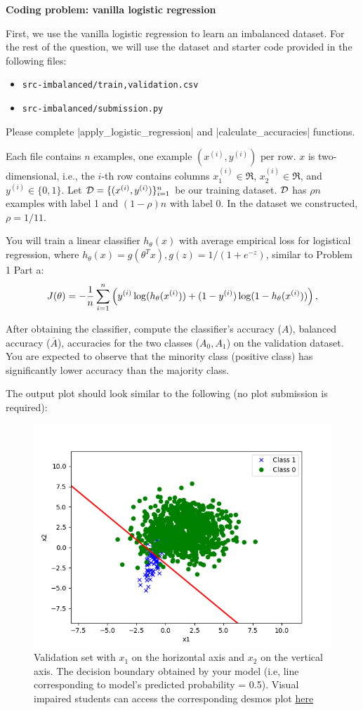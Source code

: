 \item {} \textbf{Coding problem: vanilla logistic regression}

First, we use the vanilla logistic regression to learn an imbalanced dataset. For the rest of the question, we will use the dataset and starter code provided in
the following files:
%
\begin{center}
	\begin{itemize}
		\item	\texttt{src-imbalanced/{train,validation}.csv}
		\item   \texttt{src-imbalanced/submission.py}
	\end{itemize}
\end{center}

Please complete |apply_logistic_regression| and |calculate_accuracies| functions.

Each file contains $n$ examples, one example $(x^{(i)}, y^{(i)})$ per row. $x$ is two-dimensional, i.e., the $i$-th row contains columns $x^{(i)}_1\in\Re$,
$x^{(i)}_2\in\Re$, and $y^{(i)}\in\{0, 1\}$. Let $\mathcal{D}=\{(x^{(i)}, y^{(i)})\}_{i=1}^n$ be our training dataset. $\mathcal{D}$ has $\rho n$ examples with label 1 and $(1-\rho)n$ with label 0. In the dataset we constructed, $\rho=1/11$.

You will train a linear classifier $h_{\theta}(x)$ with average empirical loss for logistical regression, where $h_\theta(x)=g(\theta^T x), g(z)=1/(1+e^{-z})$, similar to Problem 1 Part a:
\begin{align*}
J(\theta) = -\frac{1}{{n}} \sum_{i=1}^{n} \left(y^{(i)}\log(h_{\theta}(x^{(i)}))
+  (1 - y^{(i)})\log(1 - h_{\theta}(x^{(i)}))\right), 
\end{align*}

After obtaining the classifier, compute the classifier's accuracy ($A$), balanced accuracy ($\overline{A}$), accuracies for the two classes ($A_0, A_1$) on the validation dataset. You are expected to observe that the minority class (positive class) has significantly lower accuracy than the majority class. 

The output plot should look similar to the following (no plot submission is required):

\begin{figure}[H]
	\centering
	\vspace{2mm}
	\includegraphics[width=0.5\linewidth]{03-imbalanced/imbalanced_naive_pred.png}
	  \caption{Validation set with $x_1$ on the horizontal axis and $x_2$ on
	  the vertical axis. The decision boundary obtained by your model (i.e, line corresponding to model's predicted probability = 0.5). Visual impaired students can access the corresponding desmos plot \href{https://www.desmos.com/calculator/6q35atu7ti}{here}}
  \end{figure}
